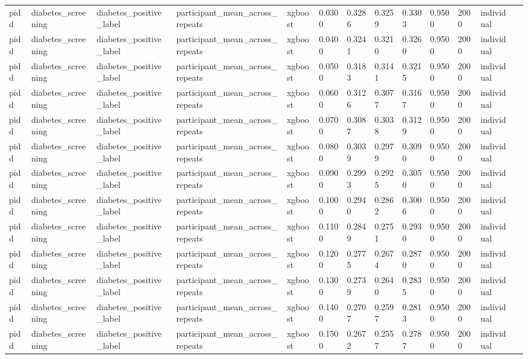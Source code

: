 \begin{tabular}{lllllllllllll}
pidd & diabetes\_screening & diabetes\_positive\_label & participant\_mean\_across\_repeats & xgboost & 0.0300 & 0.3286 & 0.3259 & 0.3303 & 0.9500 & 2000 & individual &  \\
pidd & diabetes\_screening & diabetes\_positive\_label & participant\_mean\_across\_repeats & xgboost & 0.0400 & 0.3241 & 0.3210 & 0.3260 & 0.9500 & 2000 & individual &  \\
pidd & diabetes\_screening & diabetes\_positive\_label & participant\_mean\_across\_repeats & xgboost & 0.0500 & 0.3183 & 0.3141 & 0.3215 & 0.9500 & 2000 & individual &  \\
pidd & diabetes\_screening & diabetes\_positive\_label & participant\_mean\_across\_repeats & xgboost & 0.0600 & 0.3126 & 0.3077 & 0.3167 & 0.9500 & 2000 & individual &  \\
pidd & diabetes\_screening & diabetes\_positive\_label & participant\_mean\_across\_repeats & xgboost & 0.0700 & 0.3087 & 0.3038 & 0.3129 & 0.9500 & 2000 & individual &  \\
pidd & diabetes\_screening & diabetes\_positive\_label & participant\_mean\_across\_repeats & xgboost & 0.0800 & 0.3039 & 0.2979 & 0.3090 & 0.9500 & 2000 & individual &  \\
pidd & diabetes\_screening & diabetes\_positive\_label & participant\_mean\_across\_repeats & xgboost & 0.0900 & 0.2993 & 0.2925 & 0.3050 & 0.9500 & 2000 & individual &  \\
pidd & diabetes\_screening & diabetes\_positive\_label & participant\_mean\_across\_repeats & xgboost & 0.1000 & 0.2940 & 0.2862 & 0.3006 & 0.9500 & 2000 & individual &  \\
pidd & diabetes\_screening & diabetes\_positive\_label & participant\_mean\_across\_repeats & xgboost & 0.1100 & 0.2849 & 0.2751 & 0.2930 & 0.9500 & 2000 & individual &  \\
pidd & diabetes\_screening & diabetes\_positive\_label & participant\_mean\_across\_repeats & xgboost & 0.1200 & 0.2775 & 0.2674 & 0.2870 & 0.9500 & 2000 & individual &  \\
pidd & diabetes\_screening & diabetes\_positive\_label & participant\_mean\_across\_repeats & xgboost & 0.1300 & 0.2739 & 0.2640 & 0.2835 & 0.9500 & 2000 & individual &  \\
pidd & diabetes\_screening & diabetes\_positive\_label & participant\_mean\_across\_repeats & xgboost & 0.1400 & 0.2707 & 0.2597 & 0.2813 & 0.9500 & 2000 & individual &  \\
pidd & diabetes\_screening & diabetes\_positive\_label & participant\_mean\_across\_repeats & xgboost & 0.1500 & 0.2672 & 0.2557 & 0.2787 & 0.9500 & 2000 & individual &  \\

\end{tabular}
